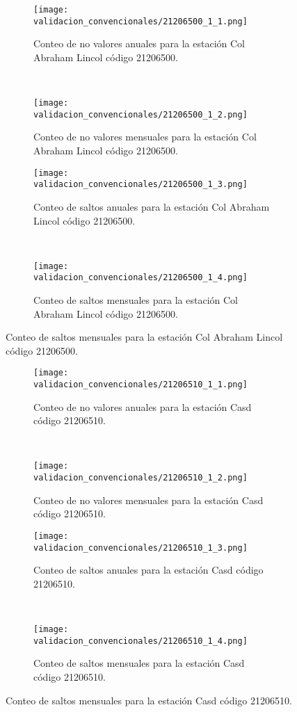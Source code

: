 \begin{figure}[H]\ContinuedFloat
\centering
	\begin{subfigure}[normla]{0.4\textwidth}
	\texttt{[image: validacion\_convencionales/21206500\_1\_1.png]}
		\caption{Conteo de no valores anuales para la estación Col Abraham Lincol código 21206500.}
		\label{subfig:a1}
		\end{subfigure}
		~
    \begin{subfigure}[normla]{0.4\textwidth}
	\texttt{[image: validacion\_convencionales/21206500\_1\_2.png]}
		\caption{Conteo de no valores mensuales para la estación Col Abraham Lincol código 21206500.}
		\label{subfig:a2}
		\end{subfigure}
		
    \begin{subfigure}[normla]{0.4\textwidth}
	\texttt{[image: validacion\_convencionales/21206500\_1\_3.png]}
		\caption{Conteo de saltos anuales para la estación Col Abraham Lincol código 21206500.}
		\label{subfig:a1}
		\end{subfigure}
		~
    \begin{subfigure}[normla]{0.4\textwidth}
	\texttt{[image: validacion\_convencionales/21206500\_1\_4.png]}
		\caption{Conteo de saltos mensuales para la estación Col Abraham Lincol código 21206500.}
		\label{subfig:a2}
		\end{subfigure}

	
\end{figure}
           
\begin{figure}[H]\ContinuedFloat
\centering
	\begin{subfigure}[normla]{0.4\textwidth}
	\texttt{[image: validacion\_convencionales/21206510\_1\_1.png]}
		\caption{Conteo de no valores anuales para la estación Casd código 21206510.}
		\label{subfig:a1}
		\end{subfigure}
		~
    \begin{subfigure}[normla]{0.4\textwidth}
	\texttt{[image: validacion\_convencionales/21206510\_1\_2.png]}
		\caption{Conteo de no valores mensuales para la estación Casd código 21206510.}
		\label{subfig:a2}
		\end{subfigure}
		
    \begin{subfigure}[normla]{0.4\textwidth}
	\texttt{[image: validacion\_convencionales/21206510\_1\_3.png]}
		\caption{Conteo de saltos anuales para la estación Casd código 21206510.}
		\label{subfig:a1}
		\end{subfigure}
		~
    \begin{subfigure}[normla]{0.4\textwidth}
	\texttt{[image: validacion\_convencionales/21206510\_1\_4.png]}
		\caption{Conteo de saltos mensuales para la estación Casd código 21206510.}
		\label{subfig:a2}
		\end{subfigure}

	
\end{figure}
           
